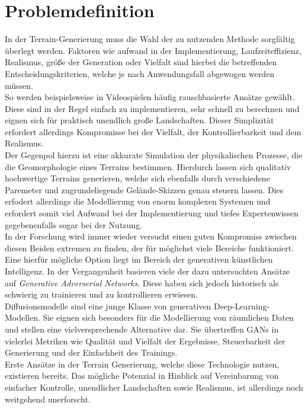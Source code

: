 \section{Problemdefinition}

In der Terrain-Generierung muss die Wahl der zu nutzenden Methode sorgfältig überlegt werden. Faktoren wie aufwand in der Implementierung, Laufzeiteffizienz, Realismus, größe der Generation oder Vielfalt sind hierbei die betreffenden Entscheidungskriterien, welche je nach Anwendungsfall abgewogen werden müssen. \\
So werden beispielsweise in Videospielen häufig rauschbasierte Ansätze gewählt. Diese sind in der Regel einfach zu implementieren, sehr schnell zu berechnen und eignen sich für praktisch unendlich große Landschaften. Dieser Simplizität erfordert allerdings Kompromisse bei der Vielfalt, der Kontrollierbarkeit und dem Realismus. \\
Der Gegenpol hierzu ist eine akkurate Simulation der physikalischen Prozesse, die die Geomorphologie eines Terrains bestimmen. Hierdurch lassen sich qualitativ hochwertige Terrains generieren, welche sich ebenfalls durch verschiedene Paremeter und zugrundeliegende Gelände-Skizzen genau steuern lassen. Dies erfodert allerdings die Modellierung von enorm komplexen Systemen und erfordert somit viel Aufwand bei der Implementierung und tiefes Expertenwissen gegebenenfalls sogar bei der Nutzung. \\
In der Forschung wird immer wieder versucht einen guten Kompromiss zwischen diesen Beiden extremen zu finden, der für möglichst viele Bereiche funktioniert. Eine hierfür mögliche Option liegt im Bereich der generativen künstlichen Intelligenz. In der Vergangenheit basieren viele der dazu untersuchten Ansätze auf \textit{Generative Adverserial Networks}. Diese haben sich jedoch historisch als schwierig zu trainieren und zu kontrollieren erwiesen. \\
Diffusionsmodelle sind eine junge Klasse von generativen Deep-Learning-Modellen. Sie eignen sich besonders für die Modellierung von räumlichen Daten und stellen eine vielversprechende Alternative dar. Sie übertreffen GANs in vielerlei Metriken wie Qualität und Vielfalt der Ergebnisse, Steuerbarkeit der Generierung und der Einfachheit des Trainings. \\
Erste Ansätze in der Terrain Generierung, welche diese Technologie nutzen, existieren bereits. Das mögliche Potenzial in Hinblick auf Vereinbarung von einfacher Kontrolle, unendlicher Landschaften sowie Realismus, ist allerdings noch weitgehend unerforscht.



